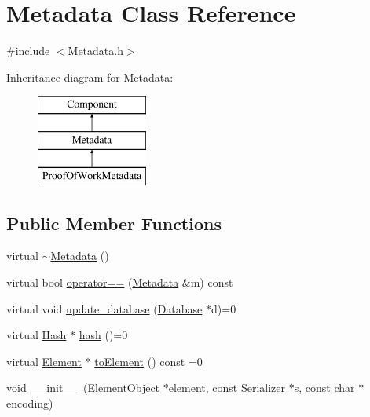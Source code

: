 \hypertarget{classMetadata}{}\section{Metadata Class Reference}
\label{classMetadata}


{\ttfamily \#include $<$Metadata.\+h$>$}

Inheritance diagram for Metadata\+:\begin{figure}[H]
\begin{center}
\leavevmode
\includegraphics[height=3.000000cm]{classMetadata}
\end{center}
\end{figure}
\subsection*{Public Member Functions}
\begin{DoxyCompactItemize}
\item 
virtual \mbox{\hyperlink{classMetadata_a29845232ba882e6dba16311f2ae4c374}{$\sim$\+Metadata}} ()
\item 
virtual bool \mbox{\hyperlink{classMetadata_a2721356452a5d366d58275dd1fc1209c}{operator==}} (\mbox{\hyperlink{classMetadata}{Metadata}} \&m) const
\item 
virtual void \mbox{\hyperlink{classMetadata_a501ab1977aac6a75f92309284e17de30}{update\+\_\+database}} (\mbox{\hyperlink{classDatabase}{Database}} $\ast$d)=0
\item 
virtual \mbox{\hyperlink{classHash}{Hash}} $\ast$ \mbox{\hyperlink{classMetadata_a893b85a8fe38060c72bdda20818a7334}{hash}} ()=0
\item 
virtual \mbox{\hyperlink{classElement}{Element}} $\ast$ \mbox{\hyperlink{classComponent_a3e63d8c993e417a4af3f56d65ebfc7ea}{to\+Element}} () const =0
\item 
void \mbox{\hyperlink{classComponent_a28212595f8ee85fe009bd233bc99b2fc}{\+\_\+\+\_\+init\+\_\+\+\_\+}} (\mbox{\hyperlink{classElementObject}{Element\+Object}} $\ast$element, const \mbox{\hyperlink{classSerializer}{Serializer}} $\ast$s, const char $\ast$encoding)
\end{DoxyCompactItemize}
